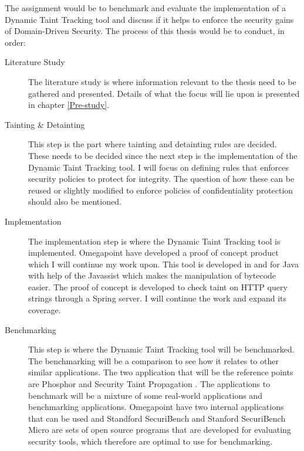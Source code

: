 \documentclass{../kththesis}
\begin{document}
	\noindent
	The assignment would be to benchmark and evaluate the implementation of a Dynamic Taint Tracking tool and discuss if it helps to enforce the security gains of Domain-Driven Security. The process of this thesis would be to conduct, in order:
	
	\begin{description}  
		\item [Literature Study]
		The literature study is where information relevant to the thesis need to be gathered and presented. Details of what the focus will lie upon is presented in chapter \ref{Pre-study}.
	
		\item [Tainting \& Detainting]
		This step is the part where tainting and detainting rules are decided. These needs to be decided since the next step is the implementation of the Dynamic Taint Tracking tool. I will focus on defining rules that enforces security policies to protect for integrity. The question of how these can be reused or slightly modified to enforce policies of confidentiality protection should also be mentioned.
	
		\item [Implementation]
		The implementation step is where the Dynamic Taint Tracking tool is implemented. Omegapoint have developed a proof of concept product which I will continue my work upon. This tool is developed in and for Java with help of the Javassist \parencite{Javassist} which makes the manipulation of bytecode easier. The proof of concept is developed to check taint on HTTP query strings through a Spring server. I will continue the work and expand its coverage.
	
	
		\item [Benchmarking]
		This step is where the Dynamic Taint Tracking tool will be benchmarked. The benchmarking will be a comparison to see how it relates to other similar applications. The two application that will be the reference points are Phosphor \parencite{phosphor} and Security Taint Propagation \parencite{securityTaint}. The applications to benchmark will be a mixture of some real-world applications and benchmarking applications. Omegapoint have two internal applications that can be used and Standford SecuriBench \parencite{securiBench} and Stanford SecuriBench Micro \parencite{securiBenchMicro} are sets of open source programs that are developed for evaluating security tools, which therefore are optimal to use for benchmarking.
		

\end{description}
\end{document}
